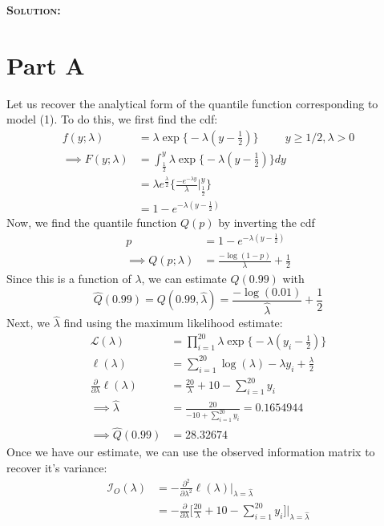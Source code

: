 \documentclass[12pt,oneside]{article}
\newenvironment{solution}
    {\textbf{\textsc{Solution:}}\\}
    {\newpage}
\def\l{\ell}
\def\pt{\partial}
\def\fish{\mathcal{I}}
\begin{document}
\begin{solution}
\section*{Part A}
Let us recover the analytical form of the quantile function corresponding to model (1). To do this, we first find the cdf:
\begin{align*}
    f(y;\lambda)&=\lambda \exp\bigg\{-\lambda(y-\frac{1}{2})\bigg\}\hspace{1cm} y \geq 1/2, \lambda > 0\\
    \implies F(y;\lambda)&= \int_\frac{1}{2}^y\lambda \exp\bigg\{-\lambda(y-\frac{1}{2})\bigg\}dy\\
    &=\lambda e^\frac{\lambda}{2}\bigg\{ \frac{-e^{-\lambda y}}{\lambda}\bigg|_{\frac{1}{2}}^y\bigg\}\\
    &=1-e^{-\lambda (y-\frac{1}{2})}
\end{align*}
Now, we find the quantile function $Q(p)$ by inverting the cdf
\begin{align*}
    p&=1-e^{-\lambda (y-\frac{1}{2})}\\
    \implies Q(p;\lambda)&=\frac{-\log(1-p)}{\lambda}+\frac{1}{2}
\end{align*}
Since this is a function of $\lambda$, we can estimate $Q(0.99)$ with \[\hat{Q}(0.99)=Q(0.99, \hat{\lambda})= \frac{-\log(0.01)}{\hat{\lambda}}+\frac{1}{2}\]
Next, we $\hat{\lambda}$ find using the maximum likelihood estimate:
\begin{align*}
    \mathcal{L}(\lambda)&=\prod_{i=1}^{20}\lambda \exp\bigg\{-\lambda(y_i-\frac{1}{2})\bigg\}\\
    \l(\lambda)&=\sum_{i=1}^{20} \log(\lambda)-\lambda y_i + \frac{\lambda}{2}\\
    \frac{\pt }{\pt \lambda}\l(\lambda)&= \frac{20}{\lambda}+10-\sum_{i=1}^{20}y_i\\
    \implies \hat{\lambda}&=\frac{20}{-10+\sum_{i=1}^{20}y_i}=0.1654944\\
    \implies \hat{Q}(0.99)&=28.32674
\end{align*}
Once we have our estimate, we can use the observed information matrix to recover it's variance:
\begin{align*}
    \fish_{O}(\lambda)&= -\frac{\pt^2}{\pt \lambda^2}\l(\lambda)\bigg|_{\lambda=\hat{\lambda}}\\
    &=-\frac{\pt }{\pt \lambda}\bigg[ \frac{20}{\lambda}+10-\sum_{i=1}^{20}y_i \bigg]\bigg|_{\lambda=\hat{\lambda}}\\

\end{align*}
\end{solution}
\end{document}
